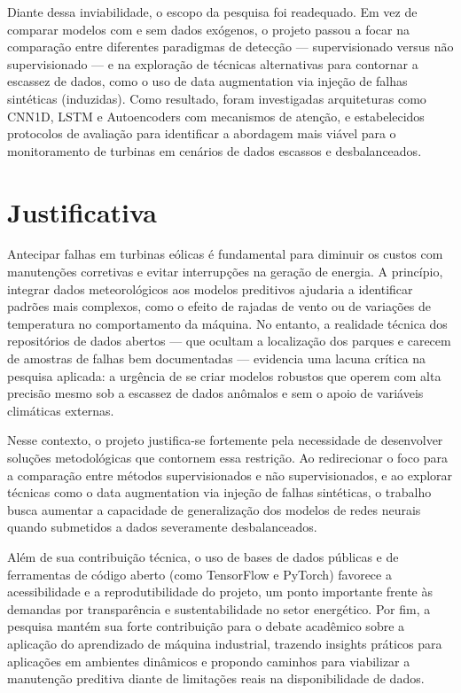 \documentclass[12pt]{article}
\begin{document}
Diante dessa inviabilidade, o escopo da pesquisa foi readequado. Em vez de comparar modelos com e sem dados exógenos, o projeto passou a focar na comparação entre diferentes paradigmas de detecção — supervisionado versus não supervisionado — e na exploração de técnicas alternativas para contornar a escassez de dados, como o uso de data augmentation via injeção de falhas sintéticas (induzidas). Como resultado, foram investigadas arquiteturas como CNN1D, LSTM e Autoencoders com mecanismos de atenção, e estabelecidos protocolos de avaliação para identificar a abordagem mais viável para o monitoramento de turbinas em cenários de dados escassos e desbalanceados.

\section{Justificativa}
Antecipar falhas em turbinas eólicas é fundamental para diminuir os custos com manutenções corretivas e evitar interrupções na geração de energia. A princípio, integrar dados meteorológicos aos modelos preditivos ajudaria a identificar padrões mais complexos, como o efeito de rajadas de vento ou de variações de temperatura no comportamento da máquina. No entanto, a realidade técnica dos repositórios de dados abertos — que ocultam a localização dos parques e carecem de amostras de falhas bem documentadas — evidencia uma lacuna crítica na pesquisa aplicada: a urgência de se criar modelos robustos que operem com alta precisão mesmo sob a escassez de dados anômalos e sem o apoio de variáveis climáticas externas.  

Nesse contexto, o projeto justifica-se fortemente pela necessidade de desenvolver soluções metodológicas que contornem essa restrição. Ao redirecionar o foco para a comparação entre métodos supervisionados e não supervisionados, e ao explorar técnicas como o data augmentation via injeção de falhas sintéticas, o trabalho busca aumentar a capacidade de generalização dos modelos de redes neurais quando submetidos a dados severamente desbalanceados.

Além de sua contribuição técnica, o uso de bases de dados públicas e de ferramentas de código aberto (como TensorFlow e PyTorch) favorece a acessibilidade e a reprodutibilidade do projeto, um ponto importante frente às demandas por transparência e sustentabilidade no setor energético. Por fim, a pesquisa mantém sua forte contribuição para o debate acadêmico sobre a aplicação do aprendizado de máquina industrial, trazendo insights práticos para aplicações em ambientes dinâmicos e propondo caminhos para viabilizar a manutenção preditiva diante de limitações reais na disponibilidade de dados.
\end{document}
